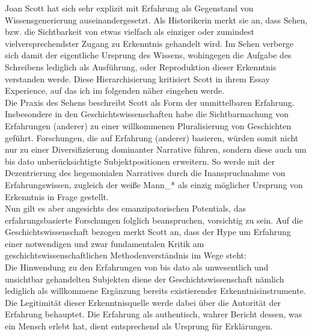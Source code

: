 Joan Scott hat sich sehr explizit mit Erfahrung als Gegenstand von
Wissensgenerierung auseinandergesetzt. Als Historikerin merkt sie an, dass
Sehen, bzw. die Sichtbarkeit von etwas vielfach als einziger oder zumindest
vielversprechendster Zugang zu Erkenntnis gehandelt wird. Im Sehen verberge
sich damit der eigentliche Ursprung des Wissens, wohingegen die Aufgabe des
Schreibens lediglich als Ausführung, oder Reproduktion dieser Erkenntnis
verstanden werde. Diese Hierarchisierung kritisiert Scott in ihrem Essay
\glqq Experience\grqq \footnotemark {}, auf das ich im folgenden näher eingehen werde.\\
Die Praxis des Sehens beschreibt Scott als Form der unmittelbaren Erfahrung.
Insbesondere in den Geschichtswissenschaften habe die Sichtbarmachung von
Erfahrungen (anderer) zu einer willkommenen \glqq Pluralisierung von
Geschichten\grqq \footnotemark {} geführt. Forschungen, die auf Erfahrung (anderer) basieren, würden somit
nicht nur zu einer Diversifizierung dominanter Narrative führen, sondern diese
auch um bis dato unberücksichtigte Subjektpositionen erweitern.\footnotemark {} So werde mit
der Dezentrierung des hegemonialen Narratives durch die Inanspruchnahme von
Erfahrungswissen, zugleich der weiße Mann\_* als einzig möglicher Ursprung von
Erkenntnis in Frage gestellt. \\
Nun gilt es aber angesichts des emanzipatorischen Potentials, das
erfahrungsbasierte Forschungen folglich beanspruchen, vorsichtig zu sein. Auf
die Geschichtswissenschaft bezogen merkt Scott an, dass der Hype um Erfahrung
einer notwendigen und zwar fundamentalen Kritik am geschichtswissenschaftlichen
Methodenverständnis im Wege steht: \\
Die Hinwendung zu den Erfahrungen von bis
dato als unwesentlich und unsichtbar gehandelten Subjekten diene der
Geschichtswissenschaft nämlich lediglich als willkommene Ergänzung bereits
existierender Erkenntnisinstrumente. Die Legitimität dieser Erkenntnisquelle
werde dabei über die \glqq Autorität der Erfahrung\grqq \footnotemark
{} behauptet. Die Erfahrung als \glqq authentisch, wahrer
Bericht dessen, was ein Mensch erlebt hat, dient entsprechend als Ursprung für
Erklärungen.\grqq \footnotemark {}\\

